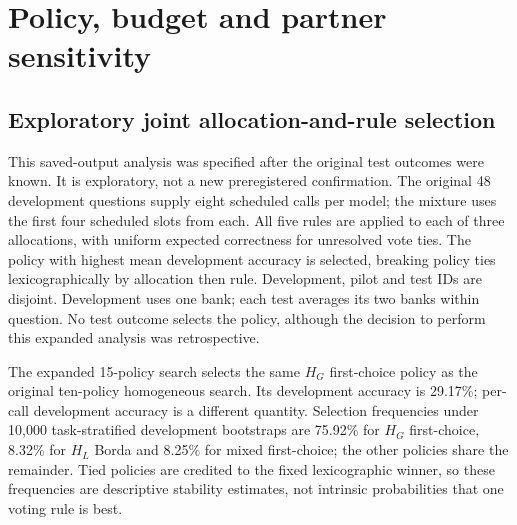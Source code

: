 
\section{Policy, budget and partner sensitivity}
\subsection{Exploratory joint allocation-and-rule selection}\label{app:joint_policy}

This saved-output analysis was specified after the original test outcomes were known. It is exploratory, not a new preregistered confirmation. The original 48 development questions supply eight scheduled calls per model; the mixture uses the first four scheduled slots from each. All five rules are applied to each of three allocations, with uniform expected correctness for unresolved vote ties. The policy with highest mean development accuracy is selected, breaking policy ties lexicographically by allocation then rule. Development, pilot and test IDs are disjoint. Development uses one bank; each test averages its two banks within question. No test outcome selects the policy, although the decision to perform this expanded analysis was retrospective.

The expanded 15-policy search selects the same $H_G$ first-choice policy as the original ten-policy homogeneous search. Its development accuracy is 29.17\%; per-call development accuracy is a different quantity. Selection frequencies under 10,000 task-stratified development bootstraps are 75.92\% for $H_G$ first-choice, 8.32\% for $H_L$ Borda and 8.25\% for mixed first-choice; the other policies share the remainder. Tied policies are credited to the fixed lexicographic winner, so these frequencies are descriptive stability estimates, not intrinsic probabilities that one voting rule is best.

